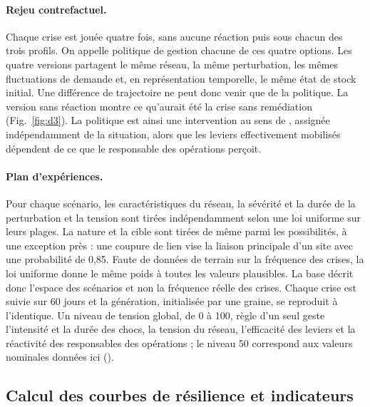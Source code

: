 \paragraph{Rejeu contrefactuel.} Chaque crise est jouée quatre fois, sans aucune réaction puis sous chacun des trois profils. On appelle politique de gestion chacune de ces quatre options. Les quatre versions partagent le même réseau, la même perturbation, les mêmes fluctuations de demande et, en représentation temporelle, le même état de stock initial. Une différence de trajectoire ne peut donc venir que de la politique. La version sans réaction montre ce qu'aurait été la crise sans remédiation (Fig.~\ref{fig:d3}). La politique est ainsi une intervention au sens de \citet{pearl2009}, assignée indépendamment de la situation, alors que les leviers effectivement mobilisés dépendent de ce que le responsable des opérations perçoit.

\begin{center}

\label{fig:d3}
\end{center}

\paragraph{Plan d'expériences.} Pour chaque scénario, les caractéristiques du réseau, la sévérité et la durée de la perturbation et la tension sont tirées indépendamment selon une loi uniforme sur leurs plages. La nature et la cible sont tirées de même parmi les possibilités, à une exception près : une coupure de lien vise la liaison principale d'un site avec une probabilité de 0,85. Faute de données de terrain sur la fréquence des crises, la loi uniforme donne le même poids à toutes les valeurs plausibles. La base décrit donc l'espace des scénarios et non la fréquence réelle des crises. Chaque crise est suivie sur 60 jours et la génération, initialisée par une graine, se reproduit à l'identique. Un niveau de tension global, de 0 à 100, règle d'un seul geste l'intensité et la durée des chocs, la tension du réseau, l'efficacité des leviers et la réactivité des responsables des opérations ; le niveau 50 correspond aux valeurs nominales données ici ().

\subsection{Calcul des courbes de résilience et indicateurs}
\label{sec:3.3}


